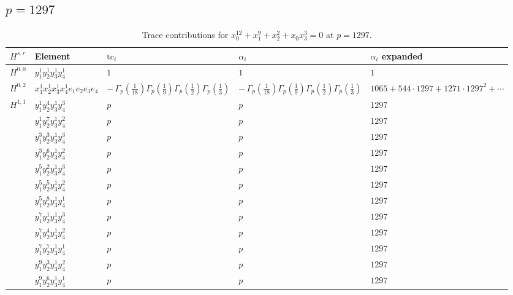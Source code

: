 \documentclass[11pt]{article}
\begin{document}
\subsection*{$p = 1297$}

\begin{table}[ht]
\centering
\caption{Trace contributions for $x_0^{12} + x_1^{9} + x_2^{2} + x_0 x_3^{3} = 0$ at $p=1297$.}\label{tab:deformed-77}
\renewcommand{\arraystretch}{1.1}
{\scriptsize
\begin{tabular}{@{}lllll@{}}
\toprule
$H^{s,r}$ & Element & $\mathrm{tc}_i$ & $\alpha_i$ & $\alpha_i$ expanded \\
\midrule
$H^{0,0}$ & $y_{1}^{1} y_{2}^{1} y_{3}^{1} y_{4}^{1}$ & $1$ & $1$ & $1$ \\
\midrule
$H^{0,2}$ & $x_{1}^{1} x_{2}^{1} x_{3}^{1} x_{4}^{1}  e_{1} e_{2} e_{3} e_{4}$ & $- \, \Gamma_p \left( \frac{1}{18} \right) \Gamma_p \left( \frac{1}{9} \right) \Gamma_p \left( \frac{1}{2} \right) \Gamma_p \left( \frac{1}{3} \right)$ & $- \, \Gamma_p \left( \frac{1}{18} \right) \Gamma_p \left( \frac{1}{9} \right) \Gamma_p \left( \frac{1}{2} \right) \Gamma_p \left( \frac{1}{3} \right)$ & $1065{+}544{\cdot}1297{+}1271{\cdot}1297^{2}{+}\cdots$ \\
\midrule
$H^{1,1}$ & $y_{1}^{1} y_{2}^{4} y_{3}^{1} y_{4}^{3}$ & $p \,$ & $p \,$ & $1297$ \\
 & $y_{1}^{1} y_{2}^{7} y_{3}^{1} y_{4}^{2}$ & $p \,$ & $p \,$ & $1297$ \\
 & $y_{1}^{3} y_{2}^{3} y_{3}^{1} y_{4}^{3}$ & $p \,$ & $p \,$ & $1297$ \\
 & $y_{1}^{3} y_{2}^{6} y_{3}^{1} y_{4}^{2}$ & $p \,$ & $p \,$ & $1297$ \\
 & $y_{1}^{5} y_{2}^{2} y_{3}^{1} y_{4}^{3}$ & $p \,$ & $p \,$ & $1297$ \\
 & $y_{1}^{5} y_{2}^{5} y_{3}^{1} y_{4}^{2}$ & $p \,$ & $p \,$ & $1297$ \\
 & $y_{1}^{5} y_{2}^{8} y_{3}^{1} y_{4}^{1}$ & $p \,$ & $p \,$ & $1297$ \\
 & $y_{1}^{7} y_{2}^{1} y_{3}^{1} y_{4}^{3}$ & $p \,$ & $p \,$ & $1297$ \\
 & $y_{1}^{7} y_{2}^{4} y_{3}^{1} y_{4}^{2}$ & $p \,$ & $p \,$ & $1297$ \\
 & $y_{1}^{7} y_{2}^{7} y_{3}^{1} y_{4}^{1}$ & $p \,$ & $p \,$ & $1297$ \\
 & $y_{1}^{9} y_{2}^{3} y_{3}^{1} y_{4}^{2}$ & $p \,$ & $p \,$ & $1297$ \\
 & $y_{1}^{9} y_{2}^{6} y_{3}^{1} y_{4}^{1}$ & $p \,$ & $p \,$ & $1297$ \\

\end{tabular}}
\end{table}
\end{document}
